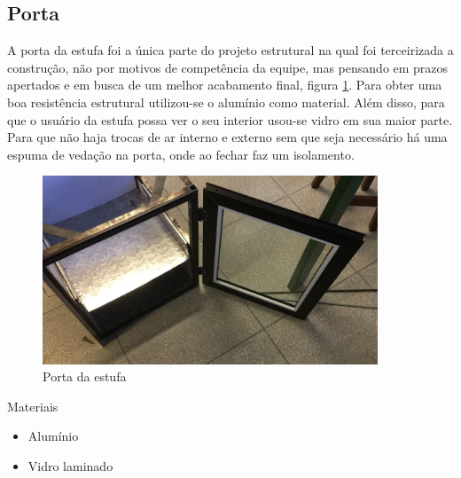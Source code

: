 \subsection{Porta}

A porta da estufa foi a única parte do projeto estrutural na qual foi terceirizada a construção, não por motivos de competência da equipe, mas pensando em prazos apertados e em busca de um melhor acabamento final, figura \ref{fig:porta}. Para obter uma boa resistência estrutural utilizou-se o alumínio como material. Além disso, para que o usuário da estufa possa ver o seu interior usou-se vidro em sua maior parte. Para que não haja trocas de ar interno e externo sem que seja necessário há uma espuma de vedação na porta, onde ao fechar faz um isolamento.

\begin{figure}[!htb]
	\centering
	\includegraphics[width=10cm]{figuras/porta.png}
	\caption{Porta da estufa}
	\label{fig:porta}
\end{figure}

Materiais

\begin{itemize}
	
	\item Alumínio
	\item Vidro laminado
\end{itemize}

